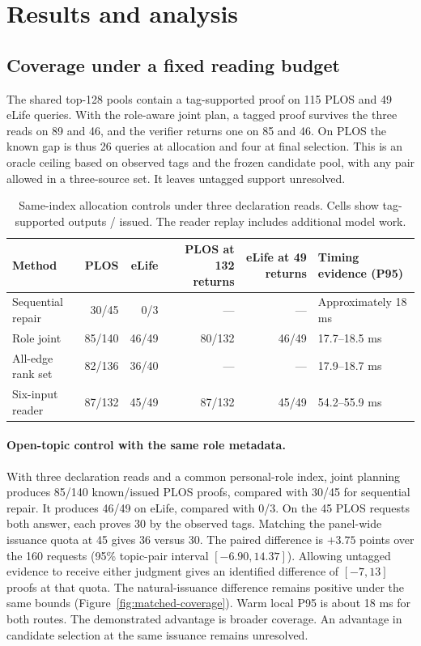 \documentclass[sigconf,natbib=true,anonymous=true,pbalance=true]{acmart}
\begin{document}
\section{Results and analysis}
\label{sec:results}
\subsection{Coverage under a fixed reading budget}
The shared top-128 pools contain a tag-supported proof on 115 PLOS and 49 eLife queries. With the role-aware joint plan, a tagged proof survives the three reads on 89 and 46, and the verifier returns one on 85 and 46. On PLOS the known gap is thus 26 queries at allocation and four at final selection. This is an oracle ceiling based on observed tags and the frozen candidate pool, with any pair allowed in a three-source set. It leaves untagged support unresolved.

\begin{table}[t]
\centering\small
\caption{Same-index allocation controls under three declaration reads. Cells show tag-supported outputs / issued. The reader replay includes additional model work.}
\label{tab:matched-methods}
\begin{tabular}{@{}lrrrrl@{}}
\toprule
Method & PLOS & eLife & PLOS at 132 returns & eLife at 49 returns & Timing evidence (P95) \\\midrule
Sequential repair & 30/45 & 0/3 & --- & --- & Approximately 18 ms \\
Role joint & 85/140 & 46/49 & 80/132 & 46/49 & 17.7--18.5 ms \\
All-edge rank set & 82/136 & 36/40 & --- & --- & 17.9--18.7 ms \\
Six-input reader & 87/132 & 45/49 & 87/132 & 45/49 & 54.2--55.9 ms \\
\bottomrule
\end{tabular}
\end{table}

\paragraph{Open-topic control with the same role metadata.}
With three declaration reads and a common personal-role index, joint planning produces 85/140 known/issued PLOS proofs, compared with 30/45 for sequential repair. It produces 46/49 on eLife, compared with 0/3. On the 45 PLOS requests both answer, each proves 30 by the observed tags. Matching the panel-wide issuance quota at 45 gives 36 versus 30. The paired difference is $+3.75$ points over the 160 requests (95\% topic-pair interval $[-6.90,14.37]$). Allowing untagged evidence to receive either judgment gives an identified difference of $[-7,13]$ proofs at that quota. The natural-issuance difference remains positive under the same bounds (Figure~\ref{fig:matched-coverage}). Warm local P95 is about 18 ms for both routes. The demonstrated advantage is broader coverage. An advantage in candidate selection at the same issuance remains unresolved.
\end{document}
